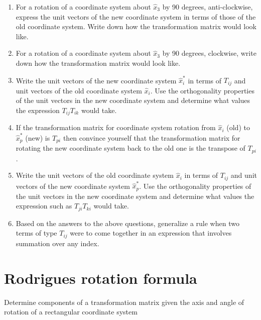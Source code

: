 \begin{mdframed}[style=tpscaffold1]
\begin{enumerate}

\item For a rotation of a coordinate system about $\hat{x}_3$ by 90 degrees, anti-clockwise, express the unit vectors of the new coordinate system in terms of those of the old coordinate system. Write down how the transformation matrix would look like.

\item For a rotation of a coordinate system about $\hat{x}_3$ by 90 degrees, clockwise, write down how the transformation matrix would look like.

\item Write the unit vectors of the new coordinate system $\hat{x}_i^*$ in terms of $T_{ij}$ and unit vectors of the old coordinate system $\hat{x}_i$. Use the orthogonality properties of the unit vectors in the new coordinate system and determine what values the expression $T_{ij}T_{ik}$ would take.

\item If the transformation matrix for coordinate system rotation from $\hat{x}_i$ (old) to $\hat{x}_p^*$ (new) is $T_{pi}$ then convince yourself that the transformation matrix for rotating the new coordinate system back to the old one is the transpose of $T_{pi}$.

\item Write the unit vectors of the old coordinate system $\hat{x}_i$ in terms of $T_{ij}$ and unit vectors of the new coordinate system $\hat{x}_p^*$. Use the orthogonality properties of the unit vectors in the new coordinate system and determine what values the expression such as $T_{ji}T_{ki}$ would take.

\item Based on the answers to the above questions, generalize a rule when two terms of type $T_{ij}$ were to come together in an expression that involves summation over any index.

\end{enumerate}
\end{mdframed}

\section{Rodrigues rotation formula}

\begin{lo3}
Determine components of a transformation matrix given the axis and angle of rotation of a rectangular coordinate system
\end{lo3}


